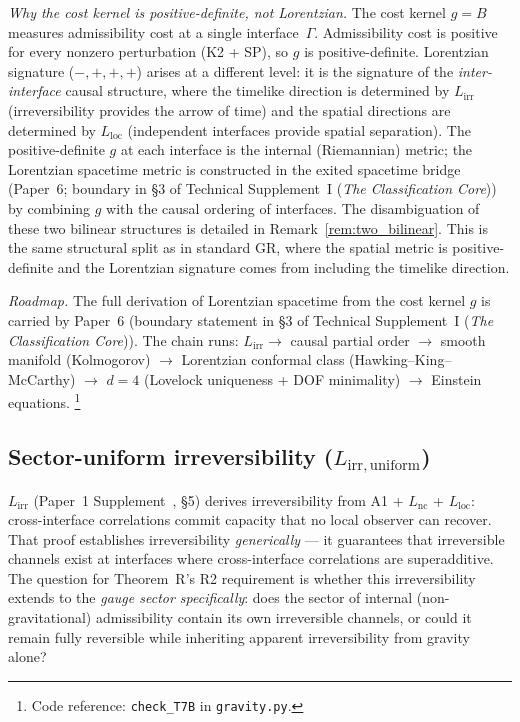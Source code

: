 \documentclass[11pt]{article}
\theoremstyle{definition}
\newcommand{\coderef}[2]{\footnote{Code reference: \texttt{#1} in \texttt{#2}.}}
\newcommand{\TSI}{Technical Supplement~I (\emph{The Classification Core})}
\begin{document}
\smallskip\noindent\textit{Why the cost kernel is positive-definite,
not Lorentzian.}\quad
The cost kernel $g = B$ measures admissibility cost at a single
interface~$\Gamma$.  Admissibility cost is positive for every nonzero
perturbation (K2 + SP), so $g$ is positive-definite.  Lorentzian
signature ($-,+,+,+$) arises at a different level: it is the signature
of the \emph{inter-interface} causal structure, where the timelike
direction is determined by $L_{\mathrm{irr}}$ (irreversibility provides
the arrow of time) and the spatial directions are determined by
$L_{\mathrm{loc}}$ (independent interfaces provide spatial separation).
The positive-definite $g$ at each interface is the internal
(Riemannian) metric; the Lorentzian spacetime metric is constructed in
the exited spacetime bridge (Paper~6; boundary in \S3 of \TSI{})
by combining $g$ with the causal ordering of interfaces.  The
disambiguation of these two bilinear structures is detailed in
Remark~\ref{rem:two_bilinear}.  This
is the same structural split as in standard GR, where the spatial metric
is positive-definite and the Lorentzian signature comes from including
the timelike direction.

\smallskip\noindent\textit{Roadmap.}\quad
The full derivation of Lorentzian spacetime from the cost kernel $g$ is
carried by Paper~6 (boundary statement in \S3 of \TSI{}).  The chain runs:
$L_{\mathrm{irr}} \to$ causal partial order $\to$ smooth manifold
(Kolmogorov) $\to$ Lorentzian conformal class (Hawking--King--McCarthy)
$\to$ $d = 4$ (Lovelock uniqueness + DOF minimality) $\to$ Einstein equations.
\coderef{check\_T7B}{gravity.py}


\subsection{Sector-uniform irreversibility ($L_{\mathrm{irr,uniform}}$)}
\label{sec:Lirr_uniform}

$L_{\mathrm{irr}}$ (Paper~1 Supplement~\cite{BrookeSupplement}, \S5) derives
irreversibility from A1 + $L_{\mathrm{nc}}$ + $L_{\mathrm{loc}}$: cross-interface
correlations commit capacity that no local observer can recover.
That proof establishes irreversibility \emph{generically} --- it
guarantees that irreversible channels exist at interfaces where
cross-interface correlations are superadditive.  The question for
Theorem~R's R2 requirement is whether this irreversibility extends to
the \emph{gauge sector specifically}: does the sector of internal
(non-gravitational) admissibility contain its own irreversible channels,
or could it remain fully reversible while inheriting apparent
irreversibility from gravity alone?
\end{document}
